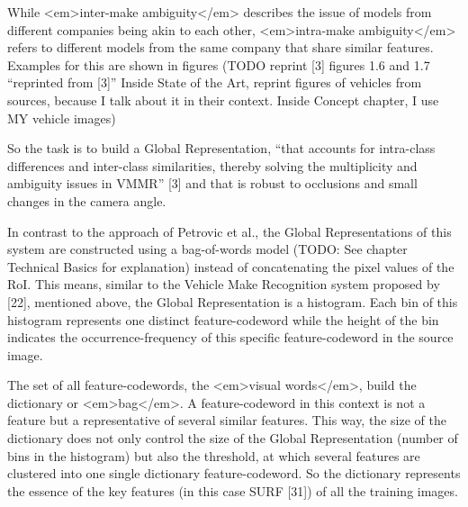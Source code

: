 While <em>inter-make ambiguity</em> describes the issue of models from different companies being akin to each other, <em>intra-make ambiguity</em> refers to different models from the same company that share similar features. Examples for this are shown in figures (TODO reprint [3] figures 1.6 and 1.7 “reprinted from [3]” Inside State of the Art, reprint figures of vehicles from sources, because I talk about it in their context. Inside Concept chapter, I use MY vehicle images)

So the task is to build a Global Representation, “that accounts for intra-class differences and inter-class similarities, thereby solving the multiplicity and ambiguity issues in VMMR” [3] and that is robust to occlusions and small changes in the camera angle.

In contrast to the approach of Petrovic et al., the Global Representations of this system are constructed using a bag-of-words model (TODO: See chapter Technical Basics for explanation) instead of concatenating the pixel values of the RoI. This means, similar to the Vehicle Make Recognition system proposed by [22], mentioned above, the Global Representation is a histogram. Each bin of this histogram represents one distinct feature-codeword while the height of the bin indicates the occurrence-frequency of this specific feature-codeword in the source image.

The set of all feature-codewords, the <em>visual words</em>, build the dictionary or <em>bag</em>. A feature-codeword in this context is not a feature but a representative of several similar features. This way, the size of the dictionary does not only control the size of the Global Representation (number of bins in the histogram) but also the threshold, at which several features are clustered into one single dictionary feature-codeword. So the dictionary represents the essence of the key features (in this case SURF [31]) of all the training images.

